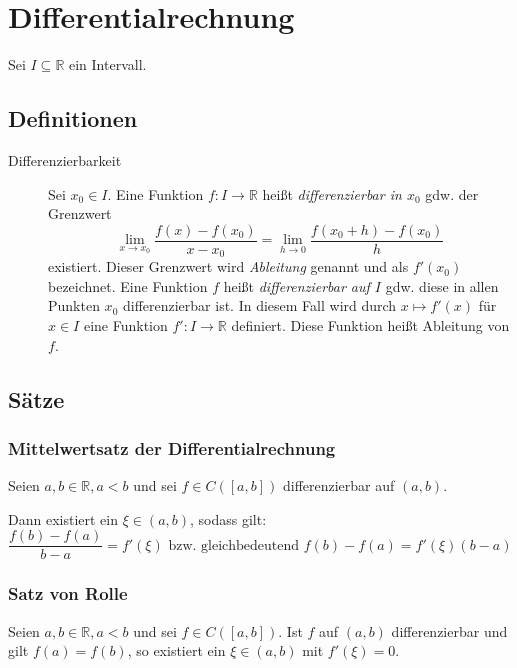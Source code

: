 \documentclass[a4paper, 11pt, accentcolor = tud3b]{tudreport}
\begin{document}
    \chapter{Differentialrechnung}
        Sei $ I \subseteq \mathbb{R} $ ein Intervall.

        \section{Definitionen}
            \begin{description}
                \item[Differenzierbarkeit] Sei $ x _ 0 \in I $. Eine Funktion $ f : I \rightarrow \mathbb{R} $ heißt \textit{differenzierbar in $ x _ 0 $} gdw. der Grenzwert \[ \lim _ { x \rightarrow x _ 0 } \frac{f(x) - f(x _ 0)}{x - x _ 0} = \lim _ { h \rightarrow 0 } \frac{f(x _ 0 + h) - f(x _ 0)}{h} \] existiert. Dieser Grenzwert wird \textit{Ableitung} genannt und als $ f'(x _ 0) $ bezeichnet. Eine Funktion $ f $ heißt \textit{differenzierbar auf $ I $} gdw. diese in allen Punkten $ x _ 0 $ differenzierbar ist. In diesem Fall wird durch $ x \mapsto f'(x) $ für $ x \in I $ eine Funktion $ f' : I \rightarrow \mathbb{R} $ definiert. Diese Funktion heißt Ableitung von $ f $.
            \end{description}

        \section{Sätze}
            \subsection{Mittelwertsatz der Differentialrechnung}
                Seien $ a, b \in \mathbb{R}, a < b $ und sei $ f \in C([a, b]) $ differenzierbar auf $ (a, b) $.

                Dann existiert ein $ \xi \in (a, b) $, sodass gilt:
                \begin{equation*}
                    \frac{f(b) - f(a)}{b - a} = f'(\xi) \text{ bzw. gleichbedeutend } f(b) - f(a) = f'(\xi)(b - a)
                \end{equation*}

            \subsection{Satz von Rolle}
                Seien $ a, b \in \mathbb{R}, a < b $ und sei $ f \in C([a, b]) $. Ist $ f $ auf $ (a, b) $ differenzierbar und gilt $ f(a) = f(b) $, so existiert ein $ \xi \in (a, b) $ mit $ f'(\xi) = 0 $.
\end{document}
